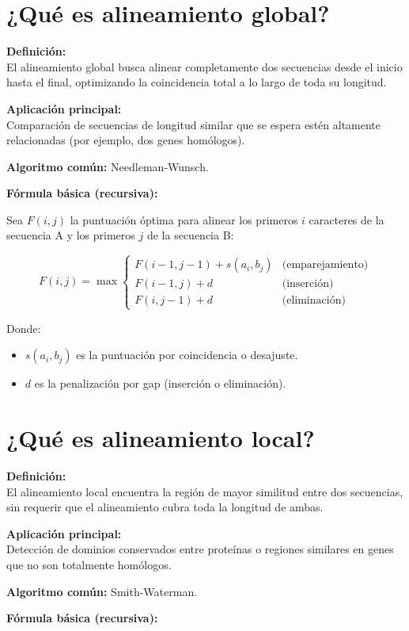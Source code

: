 \documentclass[fleqn,10pt]{article}
\begin{document}
\section{¿Qué es alineamiento global?}
\textbf{Definición:} \\
El alineamiento global busca alinear completamente dos secuencias desde el inicio hasta el final, optimizando la coincidencia total a lo largo de toda su longitud.

\textbf{Aplicación principal:} \\
Comparación de secuencias de longitud similar que se espera estén altamente relacionadas (por ejemplo, dos genes homólogos).

\textbf{Algoritmo común:} Needleman-Wunsch.

\textbf{Fórmula básica (recursiva):}

Sea $F(i,j)$ la puntuación óptima para alinear los primeros $i$ caracteres de la secuencia A y los primeros $j$ de la secuencia B:

\[
F(i,j) = \max \begin{cases}
F(i-1, j-1) + s(a_i, b_j) & \text{(emparejamiento)} \\
F(i-1, j) + d & \text{(inserción)} \\
F(i, j-1) + d & \text{(eliminación)}
\end{cases}
\]

Donde:
\begin{itemize}
    \item $s(a_i, b_j)$ es la puntuación por coincidencia o desajuste.
    \item $d$ es la penalización por gap (inserción o eliminación).
\end{itemize}

\section{¿Qué es alineamiento local?}
\textbf{Definición:} \\
El alineamiento local encuentra la región de mayor similitud entre dos secuencias, sin requerir que el alineamiento cubra toda la longitud de ambas.

\textbf{Aplicación principal:} \\
Detección de dominios conservados entre proteínas o regiones similares en genes que no son totalmente homólogos.

\textbf{Algoritmo común:} Smith-Waterman.

\textbf{Fórmula básica (recursiva):}
\end{document}
